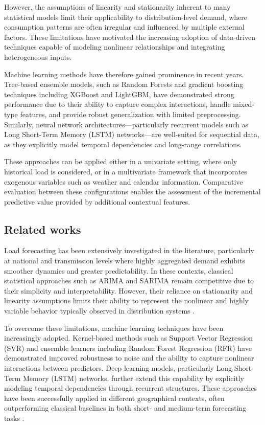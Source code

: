 However, the assumptions of linearity and stationarity inherent to many statistical models limit their applicability to distribution-level demand, where consumption patterns are often irregular and influenced by multiple external factors. These limitations have motivated the increasing adoption of data-driven techniques capable of modeling nonlinear relationships and integrating heterogeneous inputs.

Machine learning methods have therefore gained prominence in recent years. Tree-based ensemble models, such as Random Forests and gradient boosting techniques including XGBoost and LightGBM, have demonstrated strong performance due to their ability to capture complex interactions, handle mixed-type features, and provide robust generalization with limited preprocessing. Similarly, neural network architectures—particularly recurrent models such as Long Short-Term Memory (LSTM) networks—are well-suited for sequential data, as they explicitly model temporal dependencies and long-range correlations.

These approaches can be applied either in a univariate setting, where only historical load is considered, or in a multivariate framework that incorporates exogenous variables such as weather and calendar information. Comparative evaluation between these configurations enables the assessment of the incremental predictive value provided by additional contextual features.



\subsection{Related works}

Load forecasting has been extensively investigated in the literature, particularly at national and transmission levels where highly aggregated demand exhibits smoother dynamics and greater predictability. In these contexts, classical statistical approaches such as ARIMA and SARIMA remain competitive due to their simplicity and interpretability. However, their reliance on stationarity and linearity assumptions limits their ability to represent the nonlinear and highly variable behavior typically observed in distribution systems \cite{Matsila2018}.

To overcome these limitations, machine learning techniques have been increasingly adopted. Kernel-based methods such as Support Vector Regression (SVR) and ensemble learners including Random Forest Regression (RFR) have demonstrated improved robustness to noise and the ability to capture nonlinear interactions between predictors. Deep learning models, particularly Long Short-Term Memory (LSTM) networks, further extend this capability by explicitly modeling temporal dependencies through recurrent structures. These approaches have been successfully applied in different geographical contexts, often outperforming classical baselines in both short- and medium-term forecasting tasks \cite{Aquila2023, DosSantos2024, Dong2019, Alsalem2025}.

